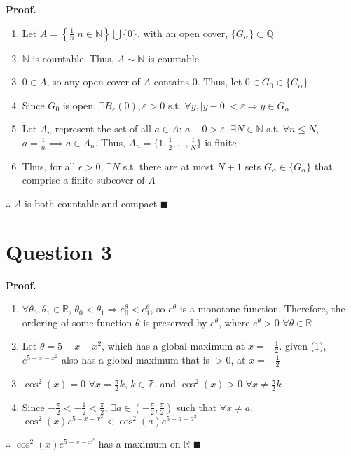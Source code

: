 \documentclass{article}
\newcommand{\N}{\mathbb{N}}
\newcommand{\Z}{\mathbb{Z}}
\newcommand{\R}{\mathbb{R}}
\newcommand{\Q}{\mathbb{Q}}
\begin{document}
\textbf{Proof.}
\begin{enumerate}
	\item Let $A=\left\{\frac{1}{n}|n\in\N\right\}\bigcup\{0\}$, with an open cover, $\{G_\alpha\}\subset\Q$
	
	\item $\N$ is countable. Thus, $A\sim\N$ is countable
	
	\item $0\in A$, so any open cover of $A$ contains $0$. Thus, let $0\in G_0\in\{G_\alpha\}$
	
	\item Since $G_0$ is open, $\exists B_\varepsilon(0),\varepsilon>0$ s.t. $\forall y, |y-0|<\varepsilon\Rightarrow y\in G_\alpha$
	
	\item Let $A_n$ represent the set of all $a\in A$: $a-0> \varepsilon$. $\exists N\in\N$ s.t. $\forall n\leq N$, $a=\frac{1}{n}\implies a\in A_n$. Thus, $A_n = \{1,\frac{1}{2},...,\frac{1}{N}\}$ is finite
	
	\item Thus, for all $\epsilon>0$, $\exists N$ s.t. there are at most $N+1$ sets $G_\alpha\in\{G_\alpha\}$ that comprise a finite subcover of $A$
\end{enumerate}
$\therefore$ $A$ is both countable and compact $\blacksquare$




\section*{Question 3}

\textbf{Proof.}
\begin{enumerate}
	\item $\forall\theta_0,\theta_1\in\R$, $\theta_0<\theta_1\Rightarrow e^\theta_0<e^\theta_1$, so $e^\theta$ is a monotone function. Therefore, the ordering of some function $\theta$ is preserved by $e^\theta$, where $e^\theta>0$ $\forall\theta\in\R$
	
	\item Let $\theta=5-x-x^2$, which has a global maximum at $x=-\frac{1}{2}$. given (1), $e^{5-x-x^2}$ also has a global maximum that is $>0$, at $x=-\frac{1}{2}$
	
	\item $\cos^2(x)=0$ $\forall x=\frac{\pi}{2}k$, $k\in\Z$, and $\cos^2(x)>0$ $\forall x\neq\frac{\pi}{2}k$
	
	\item Since $-\frac{\pi}{2}<-\frac{1}{2}<\frac{\pi}{2}$, $\exists a\in(-\frac{\pi}{2},\frac{\pi}{2})$ such that $\forall x\neq a$, $\cos^2(x)e^{5-x-x^2}<\cos^2(a)e^{5-a-a^2}$
\end{enumerate}
$\therefore$ $\cos^2(x)e^{5-x-x^2}$ has a maximum on $\R$ $\blacksquare$
\end{document}
